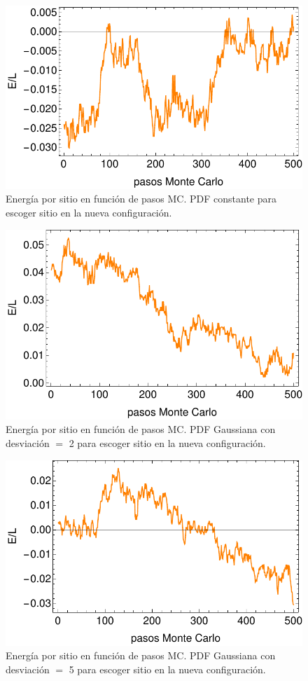 \documentclass[letterpaper,superscriptaddress,aps,pra,nolongbibliography,twocolumn,showpacs,floatfix,10pt]{revtex4-2} %
\renewcommand{\>}{\rangle}
\newcommand{\<}{\langle}
\begin{document}
\begin{figure}
\centering
\includegraphics[width=0.9\columnwidth]{intento_004}
\caption{Energía por sitio en función de pasos MC. PDF 
constante para escoger sitio en la nueva configuración.}
\end{figure}
\begin{figure}
\centering
\includegraphics[width=0.9\columnwidth]{intento_005}
\caption{Energía por sitio en función de pasos MC. PDF Gaussiana
con desviación $=$ 2 para escoger sitio en la nueva configuración.}
\end{figure}
\begin{figure}
\centering
\includegraphics[width=0.9\columnwidth]{intento_006}
\caption{Energía por sitio en función de pasos MC. PDF Gaussiana
con desviación $=$ 5 para escoger sitio en la nueva configuración.}
\end{figure}
\end{document}
